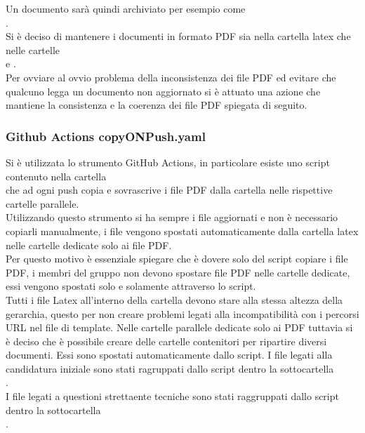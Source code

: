Un documento sarà quindi archiviato per esempio come\\
.\\
Si è deciso di mantenere i documenti in formato PDF sia nella cartella latex che nelle cartelle\\
 e .\\
Per ovviare al ovvio problema della inconsistenza dei file PDF ed evitare che qualcuno legga un documento non aggiornato si è attuato una azione che 
mantiene la consistenza e la coerenza dei file PDF spiegata di seguito.\\

\subsubsection{Github Actions copyONPush.yaml}
Si è utilizzata lo strumento GitHub Actions, in particolare esiste uno script contenuto nella cartella\\
 che ad ogni push copia e sovrascrive
i file PDF dalla cartella  nelle rispettive cartelle parallele.\\
Utilizzando questo strumento si ha sempre i file aggiornati e non è necessario copiarli manualmente, i file vengono spostati automaticamente dalla cartella latex nelle cartelle dedicate solo
ai file PDF.\\
Per questo motivo è essenziale spiegare che è dovere solo del script copiare i file PDF, i membri del gruppo non devono spostare file PDF nelle cartelle dedicate, essi vengono spostati solo e solamente attraverso 
lo script.\\
Tutti i file Latex all'interno della cartella  devono stare alla stessa altezza della gerarchia, questo per non creare problemi legati alla incompatibilità 
con i percorsi URL nel file di template.
Nelle cartelle parallele dedicate solo ai PDF tuttavia si è deciso che è possibile creare delle cartelle contenitori per ripartire diversi documenti.
Essi sono spostati automaticamente dallo script.
I file legati alla candidatura iniziale sono stati ragruppati dallo script dentro
la sottocartella\\
.\\
I file legati a questioni strettaente tecniche sono stati raggruppati dallo script dentro la sottocartella\\
.

